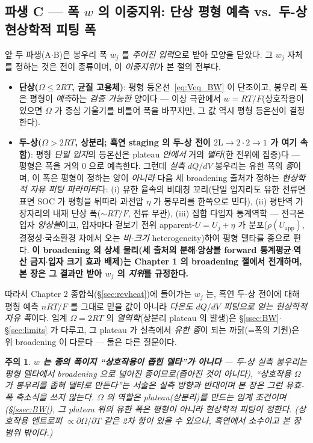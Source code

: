 \documentclass[11pt,a4paper]{article}
\newtheorem*{warnbox}{주의}
\newcommand{\app}{\mathrm{app}}
\begin{document}
\subsection{파생 C — 폭 $w$ 의 이중지위: 단상 평형 예측 vs.\ 두-상 현상학적 피팅 폭}\label{ssec:weff}
앞 두 파생(A$\cdot$B)은 봉우리 폭 $w_j$ 를 \emph{주어진 입력}으로 받아 모양을 닫았다. 그 $w_j$ 자체를 정하는
것은 전이 종류이며, 이 \emph{이중지위}가 본 절의 전부다.
\begin{itemize}[leftmargin=1.4em,itemsep=2pt]
\item \textbf{단상($\Omega\le2RT$, 균질 고용체)}: 평형 등온선~\eqref{eq:Veq_BW} 이 단조이고, 봉우리 폭은 평형이
\emph{예측}하는 \emph{검증 가능한} 양이다 — 이상 극한에서 $w=RT/F$(상호작용이 있으면 $\Omega$ 가 중심 기울기를 비틀어 폭을
바꾸지만, 그 값 역시 평형 등온선이 결정한다).
\item \textbf{두-상($\Omega>2RT$, 상분리; 흑연 staging 의 두-상 전이 $2\mathrm L\!\to\!2\cdot2\!\to\!1$ 가 여기 속함)}: 평형 \emph{단일 입자}의 등온선은
plateau \emph{안에서} 거의 \emph{델타}(한 전위에 집중)다 — 평형은 폭을 거의 0 으로 예측한다. 그런데 \emph{실측}
$dQ/dV$ 봉우리는 유한 폭의 \emph{종}이며, 이 폭은 평형이 정하는 양이 \emph{아니라} 다음 세 broadening 출처가
정하는 \emph{현상학적 자유 피팅 파라미터}다: (i) 유한 율속의 비대칭 꼬리(단일 입자라도 유한 전류면 표면 SOC
가 평형을 뒤따라 과전압 $\eta$ 가 봉우리를 한쪽으로 민다), (ii) 평탄역 가장자리의 내재 단상 폭($\sim RT/F$,
전류 무관), (iii) 집합 다입자 통계역학 — 전극은 입자 \emph{앙상블}이고, 입자마다 겉보기 전위 apparent-$U=U_j+\eta$ 가
분포($\rho(U_\app)$, 결정성$\cdot$국소환경 차에서 오는 \emph{비-크기} heterogeneity)하여 평형 델타를 종으로
편다. \textbf{이 broadening 의 상세 물리(세 출처의 분해$\cdot$앙상블 forward 통계평균$\cdot$역산 금지$\cdot$입자
크기 효과 배제)는 Chapter 1 의 broadening 절에서 전개하며, 본 장은 그 결과만 받아 $w_j$ 의 \emph{지위}를
규정한다.}
\end{itemize}
따라서 Chapter 2 종합식(\S\ref{sec:revheat})에 들어가는 $w_j$ 는, 흑연 두-상 전이에 대해 평형 예측
$nRT/F$ 를 그대로 믿을 값이 아니라 \emph{다온도 $dQ/dV$ 피팅으로 얻는 현상학적 자유 폭}이다. 임계
$\Omega=2RT$ 의 \emph{열역학}(상분리 plateau 의 발생)은 \S\ref{ssec:BW}$\cdot$\S\ref{sec:limits} 가 다루고, 그
plateau 가 실측에서 \emph{유한 종}이 되는 까닭(=폭의 기원)은 위 broadening 이 다룬다 — 둘은 다른 질문이다.
\begin{warnbox}
\textbf{$w$ 는 종의 폭이지 ``상호작용이 좁힌 델타''가 아니다} — 두-상 실측 봉우리는 평형 델타에서 broadening 으로
\emph{넓어진} 종이므로(좁아진 것이 아니다), ``상호작용 $\Omega$ 가 봉우리를 좁혀 델타로 만든다''는 서술은
\emph{실측 방향과 반대}이며 본 장은 그런 유효-폭 축소식을 쓰지 않는다. $\Omega$ 의 역할은 plateau(상분리)를
\emph{만드는} 임계 조건이며(\S\ref{ssec:BW}), 그 plateau 위의 \emph{유한 폭}은 평형이 아니라 현상학적 피팅이
정한다. (상호작용 엔트로피 $\propto\partial\Omega/\partial T$ 같은 2차 항이 있을 수 있으나, 흑연에서 소수이고
본 장 범위 밖이다.)
\end{warnbox}
\end{document}
